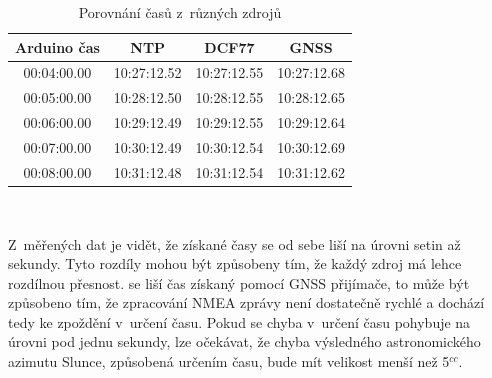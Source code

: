 \begin{table}[H]
    \centering
    \caption{Porovnání časů z~různých zdrojů}
    \begin{tabular}{|c|c|c|c|}
    \hline
    Arduino čas & NTP & DCF77 & GNSS \\
    \hline\hline
    00:04:00.00 & 10:27:12.52 & 10:27:12.55 & 10:27:12.68 \\ \hline
    00:05:00.00 & 10:28:12.50 & 10:28:12.55 & 10:28:12.65 \\ \hline
    00:06:00.00 & 10:29:12.49 & 10:29:12.55 & 10:29:12.64 \\ \hline
    00:07:00.00 & 10:30:12.49 & 10:30:12.54 & 10:30:12.69 \\ \hline
    00:08:00.00 & 10:31:12.48 & 10:31:12.54 & 10:31:12.62 \\ \hline
    \end{tabular}\\
\end{table}

Z~měřených dat je vidět, že získané časy se od sebe liší na úrovni setin až  sekundy. Tyto rozdíly mohou být způsobeny tím, že každý zdroj má lehce rozdílnou přesnost.  se liší čas získaný pomocí GNSS přijímače, to může být způsobeno tím, že zpracování NMEA zprávy není dostatečně rychlé a dochází tedy ke zpoždění v~určení času. Pokud se chyba v~určení času pohybuje na úrovni pod jednu  sekundy, lze očekávat, že chyba výsledného astronomického azimutu Slunce, způsobená určením času, bude mít velikost menší než 5\(^{cc}\).